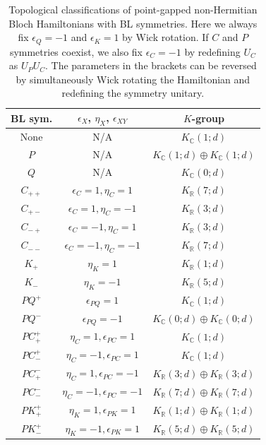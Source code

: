 \documentclass{tADP2e}
\theoremstyle{plain}
\theoremstyle{plain}
\theoremstyle{definition}
\begin{document}
\begin{table}[tbp]
\caption{Topological classifications of point-gapped non-Hermitian Bloch Hamiltonians with BL symmetries. Here we always fix $\epsilon_Q=-1$ and $\epsilon_K=1$ by Wick rotation. If $C$ and $P$ symmetries coexist, we also fix $\epsilon_C=-1$ by redefining $U_C$ as $U_PU_C$. The parameters in the brackets can be reversed by simultaneously Wick rotating the Hamiltonian and redefining the symmetry unitary.}
\begin{center}
\begin{tabular}{ccc}
\hline\hline
BL sym. & $\epsilon_X$, $\eta_X$, $\epsilon_{XY}$ & $K$-group \\ 
\hline
None & N/A  & $K_{\mathbb{C}}(1;d)$  \\ 
$P$ & N/A & $K_{\mathbb{C}}(1;d)\oplus K_{\mathbb{C}}(1;d)$ \\ 
$Q$ & N/A & $K_{\mathbb{C}}(0;d)$ \\ 
$C_{++}$ & $\epsilon_C=1,\eta_C=1$ & $K_{\mathbb{R}}(7;d)$ \\ $C_{+-}$ & $\epsilon_C=1,\eta_C=-1$ & $K_{\mathbb{R}}(3;d)$ \\ 
$C_{-+}$ & $\epsilon_C=-1,\eta_C=1$ & $K_{\mathbb{R}}(3;d)$ \\ 
$C_{--}$ & $\epsilon_C=-1,\eta_C=-1$ & $K_{\mathbb{R}}(7;d)$ \\
$K_+$ & %
$\eta_K=1$ & $K_{\mathbb{R}}(1;d)$ \\
$K_-$ & %
$\eta_K=-1$ & $K_{\mathbb{R}}(5;d)$ \\
$PQ^+$ & %
$\epsilon_{PQ}=1$ & $K_{\mathbb{C}}(1;d)$ \\
$PQ^-$ & %
$\epsilon_{PQ}=-1$ & $K_{\mathbb{C}}(0;d)\oplus K_{\mathbb{C}}(0;d)$ \\
$PC^+_+$ & %
$\eta_C=1,\epsilon_{PC}=1$ & $K_\mathbb{C}(1;d)$ \\
$PC^+_-$ & %
$\eta_C=-1,\epsilon_{PC}=1$ & $K_\mathbb{C}(1;d)$ \\
$PC^-_+$ & %
$\eta_C=1,\epsilon_{PC}=-1$ & $K_\mathbb{R}(3;d)\oplus K_\mathbb{R}(3;d)$\\
$PC^-_-$ & %
$\eta_C=-1,\epsilon_{PC}=-1$ & $K_\mathbb{R}(7;d)\oplus K_\mathbb{R}(7;d)$\\
$PK^+_+$ & %
$\eta_K=1,\epsilon_{PK}=1$ & $K_\mathbb{R}(1;d)\oplus K_\mathbb{R}(1;d)$\\
$PK^+_-$ & %
$\eta_K=-1,\epsilon_{PK}=1$ & $K_\mathbb{R}(5;d)\oplus K_\mathbb{R}(5;d)$\\

\end{tabular}
\end{center}
\end{table}
\end{document}
